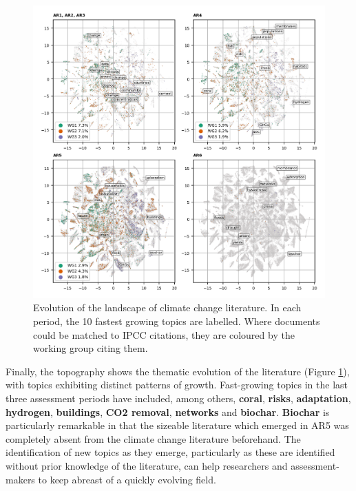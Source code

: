 \documentclass{article}
\begin{document}
\begin{linenumbers}
		
		\begin{figure}
			\begin{center}
				\includegraphics[width=180mm]{../plots_pub/topic_evolution_4.png}
				\caption{Evolution of the landscape of climate change literature. In each period, the 10 fastest growing topics are labelled. Where documents could be matched to IPCC citations, they are coloured by the working group citing them.}
				\label{evolution-map}
			\end{center}
		\end{figure}
		
		Finally, the topography shows the thematic evolution of the literature (Figure \ref{evolution-map}), with topics exhibiting distinct patterns of growth. Fast-growing topics in the last three assessment periods have included, among others, \textbf{coral}, \textbf{risks}, \textbf{adaptation}, \textbf{hydrogen}, \textbf{buildings}, \textbf{CO2 removal}, \textbf{networks} and \textbf{biochar}. \textbf{Biochar} is particularly remarkable in that the sizeable literature which emerged in AR5 was completely absent from the climate change literature beforehand. 
		The identification of new topics as they emerge, particularly as these are identified without prior knowledge of the literature, can help researchers and assessment-makers to keep abreast of a quickly evolving field.
		

\end{linenumbers}
\end{document}
